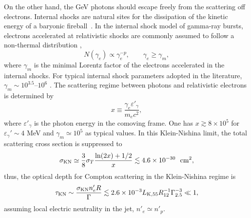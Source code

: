 \documentclass[prd,twocolumn,amsmath,amssymb,aps,linenumbers]{revtex4-2} %
\begin{document}
On the other hand, the GeV photons should escape freely from the scattering off electrons. Internal shocks are natural sites for the dissipation of the kinetic energy of a baryonic fireball~\citep[][]{1990ApJ...365L..55S,1992MNRAS.258P..41R,1993ApJ...405..278M,1994ApJ...430L..93R}.
In the internal shock model of gamma-ray bursts, electrons accelerated at relativistic shocks are commonly assumed to follow a non-thermal distribution \cite{2004RvMP...76.1143P},
\begin{equation}
N(\gamma_e) \propto \gamma_e^{-p}, \qquad \gamma_e \ge \gamma_m ,
\end{equation}
where $\gamma_m$ is the minimal Lorentz factor of the electrons accelerated in the internal shocks.
For typical internal shock parameters adopted in the literature, $\gamma_m \sim 10^{3.5}$--$10^6$ \cite{2013ApJ...769...69B,2019A&A...628A..59O}. The scattering regime between photons and relativistic electrons is determined by
\begin{equation}
x \equiv \frac{\gamma_e \varepsilon'_\gamma}{m_e c^2},
\end{equation}
where $\varepsilon'_\gamma$ is the photon energy in the comoving frame. One has $x \gtrsim 8\times 10^5$ for $\varepsilon_\gamma'\sim4$ MeV and $\gamma_m\simeq 10^{5}$ as typical values. In this Klein-Nishina limit, the total scattering cross section is suppressed to \cite{1986rpa..book.....R}
\begin{equation}
\sigma_{\rm KN} \simeq 
\frac{3}{8}\sigma_T
\frac{\ln(2x)+1/2}{x} 
\lesssim 4.6 \times 10^{-30}\ \ {\rm cm}^2,
\label{eq:sigmaKN-GBM}
\end{equation}
thus, the optical depth for Compton scattering in the Klein-Nishina regime is
\begin{equation}
\tau_{\rm KN} \sim \frac{\sigma_{\rm KN} n'_e R}{\Gamma}
\lesssim 2.6\times10^{-3} L_{\rm K, 55}R_{12}^{-1} \Gamma_{2.5}^{-3}\ll 1,
\label{eq:tauKN-GBM}
\end{equation}
assuming local electric neutrality in the jet, $n'_{e}\simeq n'_p$.
\end{document}
